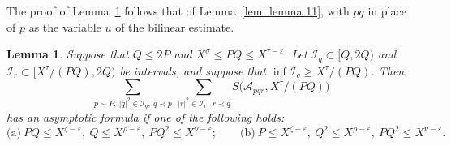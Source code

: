 \documentclass{article}
\numberwithin{equation}{section}
\newtheorem{lemma}{Lemma}
\newcommand{\Le}{\leqslant}
\newcommand{\Ge}{\geqslant}
\begin{document}
The proof of Lemma~\ref{lem: three primes} follows that of Lemma~\ref{lem: lemma 11}, with $pq$ in place of $p$ as the variable $u$ of the bilinear estimate.

\begin{lemma}
\label{lem: three primes}
Suppose that $Q \Le 2P$ and $X^{\sigma} \Le PQ \Le X^{\tau - \varepsilon}$. Let $\mathcal{I}_q \subset [Q, 2Q)$ and $\mathcal{I}_r \subset [X^{\tau}/(PQ), 2Q)$ be intervals, and suppose that $\inf \mathcal{I}_q \Ge X^{\tau}/(PQ)$. Then
\begin{equation}
\label{eq: lemma 12 sum}
\sum_{p \sim P,\ |q|^2 \in \mathcal{I}_q,\ q \prec p}\ \sum_{|r|^2 \in \mathcal{I}_r,\ r \prec q} S\bigl(\mathcal{A}_{pqr}, X^{\tau}/(PQ)\bigr)
\end{equation}
has an asymptotic formula if one of the following holds:
\begin{equation}
\label{eq: lemma 12 cases}
\text{(a)}\ PQ \Le X^{\zeta - \varepsilon},\ Q \Le X^{\rho - \varepsilon},\ PQ^2 \Le X^{\nu - \varepsilon}; \qquad \text{(b)}\ P \Le X^{\zeta - \varepsilon},\ Q^2 \Le X^{\rho - \varepsilon},\ PQ^2 \Le X^{\nu - \varepsilon}.
\end{equation}
\end{lemma}
\end{document}
